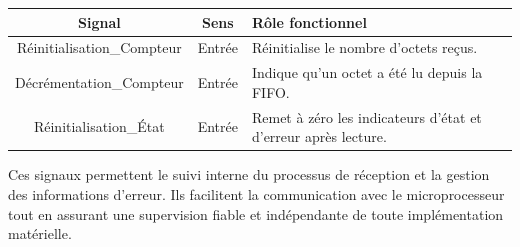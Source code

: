 \begin{center}
\renewcommand{\arraystretch}{1.2}
\small
\begin{tabularx}{\textwidth}{|c||c|X|}
    \hline
    \textbf{Signal} & \textbf{Sens} & \textbf{Rôle fonctionnel} \\ \hline
    Réinitialisation\_Compteur & Entrée & Réinitialise le nombre d’octets reçus. \\ \hline
    Décrémentation\_Compteur & Entrée & Indique qu’un octet a été lu depuis la FIFO. \\ \hline
    Réinitialisation\_État & Entrée & Remet à zéro les indicateurs d’état et d’erreur après lecture. \\ \hline
\end{tabularx}
\end{center}

Ces signaux permettent le suivi interne du processus de réception et la gestion des informations d’erreur.  
Ils facilitent la communication avec le microprocesseur tout en assurant une supervision fiable et indépendante de toute implémentation matérielle.

